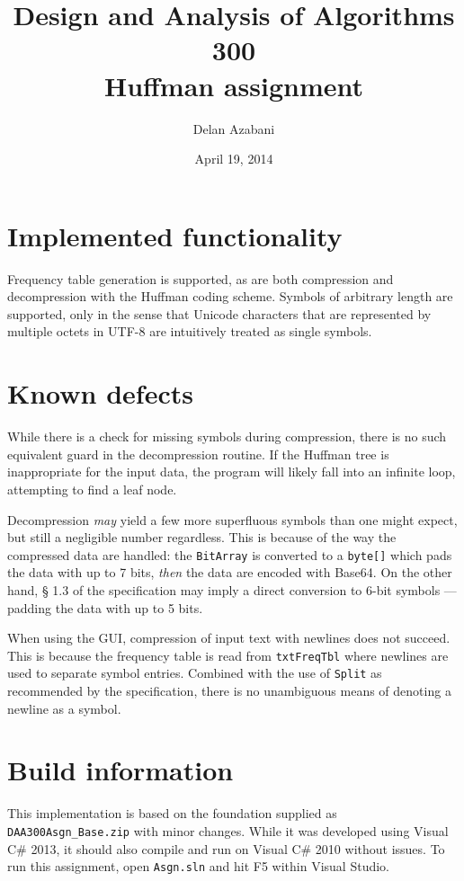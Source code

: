 \documentclass[a4paper,12pt]{article}
\title{Design and Analysis of Algorithms 300\\Huffman assignment}
\date{April 19, 2014}
\author{Delan Azabani}
\begin{document}
\maketitle

\section{Implemented functionality}

Frequency table generation is supported, as are both compression and
decompression with the Huffman coding scheme. Symbols of arbitrary length are
supported, only in the sense that Unicode characters that are represented by
multiple octets in UTF-8 are intuitively treated as single symbols.

\section{Known defects}

While there is a check for missing symbols during compression, there is no such
equivalent guard in the decompression routine. If the Huffman tree is
inappropriate for the input data, the program will likely fall into an infinite
loop, attempting to find a leaf node.

Decompression \emph{may} yield a few more superfluous symbols than one might
expect, but still a negligible number regardless. This is because of the way
the compressed data are handled: the \texttt{BitArray} is converted to a
\texttt{byte[]} which pads the data with up to 7 bits, \emph{then} the data are
encoded with Base64. On the other hand, § 1.3 of the specification may imply a
direct conversion to 6-bit symbols --- padding the data with up to 5 bits.

When using the GUI, compression of input text with newlines does not succeed.
This is because the frequency table is read from \texttt{txtFreqTbl} where
newlines are used to separate symbol entries. Combined with the use of
\texttt{Split} as recommended by the specification, there is no unambiguous
means of denoting a newline as a symbol.

\section{Build information}

This implementation is based on the foundation supplied as
\texttt{DAA300Asgn\_Base.zip} with minor changes. While it was developed using
Visual C\# 2013, it should also compile and run on Visual C\# 2010 without
issues. To run this assignment, open \texttt{Asgn.sln} and hit F5 within Visual
Studio.
\end{document}
